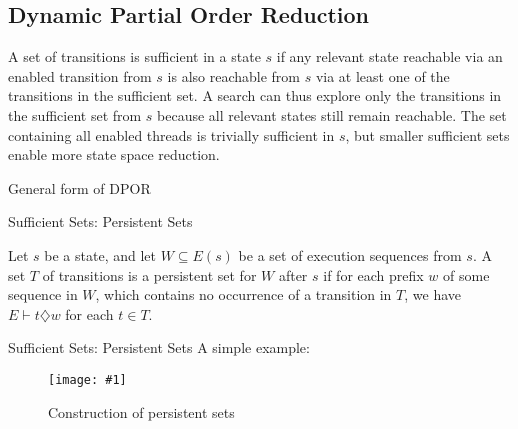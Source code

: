 \documentclass[9pt]{beamer}
\newcommand{\trace}[2]{
\begin{figure}[H]
\centering
\texttt{[image: \#1]}
\caption{#2}
\label{#2}
\end{figure}
}
\begin{document}
\subsection{Dynamic Partial Order Reduction}

\begin{frame}
\begin{definition}
A set of transitions is sufficient in a state $s$ if any relevant
state reachable via an enabled transition from $s$ is also reachable from $s$ via at least one of the transitions in the sufficient
set. A search can thus explore only the transitions in the
sufficient set from $s$ because all relevant states still remain
reachable. The set containing all enabled threads is trivially
sufficient in $s$, but smaller sufficient sets enable more state
space reduction.
\end{definition}

    
\end{frame}

\begin{frame}{General form of DPOR}
    
\begin{figure}
\centering
{}
\end{figure}

\end{frame}
\begin{frame}{Sufficient Sets: Persistent Sets}
    
\begin{definition}
Let $s$ be a state, and let $W \subseteq E(s)$ be a set
of execution sequences from $s$. A set $T$ of transitions is a persistent set for $W$
after $s$ if for each prefix $w$ of some sequence in $W$, which contains no occurrence
of a transition in $T$,  we have $E \vdash t \diamondsuit w$ for each $t \in T$.
\end{definition}
\end{frame}

\begin{frame}{Sufficient Sets: Persistent Sets}
A simple example:
    
\trace{../img/persistent.pdf}{Construction of persistent sets}
    
\end{frame}
\end{document}
